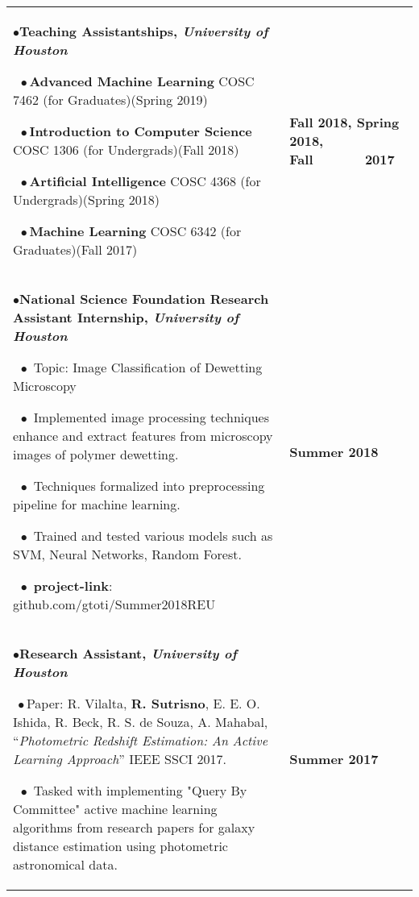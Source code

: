 \documentclass{article}
\begin{document}
\begin{flushleft}
\begin{tabular}{p{12.5cm} p{2.5cm}}
{$\bullet$}\textbf{Teaching Assistantships, \textit{University of Houston}}

    $\ \ \bullet$\textbf{Advanced Machine Learning} COSC 7462 (for Graduates)(Spring 2019)

    $\ \ \bullet$\textbf{Introduction to Computer Science} COSC 1306 (for Undergrads)(Fall 2018)

    $\ \ \bullet$\textbf{Artificial Intelligence} COSC 4368 (for Undergrads)(Spring 2018)

    $\ \ \bullet$\textbf{Machine Learning} COSC 6342 (for Graduates)(Fall 2017)
    & \textbf{Fall 2018, Spring 2018, Fall\ \ \ \ \ \ \ 2017} \\[0.75cm]


{$\bullet$}\textbf{National Science Foundation Research Assistant Internship, \textit{University of Houston}}

    $\ \ \bullet$ Topic: Image Classification of Dewetting Microscopy

    $\ \ \bullet$ Implemented image processing techniques enhance and extract features
    from microscopy images of polymer dewetting. 

    $\ \ \bullet$ Techniques formalized into preprocessing pipeline for machine learning.

    $\ \ \bullet$ Trained and tested various models such as SVM, Neural Networks, Random Forest.

    $\ \ \bullet$ \textbf{project-link}: github.com/gtoti/Summer2018REU

    & \textbf{Summer 2018}
    \\[0.75cm]


{$\bullet$}\textbf{Research Assistant, \textit{University of Houston}}

{$\ \bullet$}Paper: R. Vilalta, \textbf{R. Sutrisno}, E. E. O. Ishida, R. Beck, R. S. de Souza, A. Mahabal,
``\textit{Photometric Redshift Estimation: An Active Learning Approach}'' IEEE SSCI 2017.

    $\ \ \bullet$ Tasked with implementing "Query By Committee" active machine learning algorithms from research papers for galaxy distance estimation using photometric astronomical data.

    & \textbf{Summer 2017}


\end{tabular}
\end{flushleft}
\end{document}
